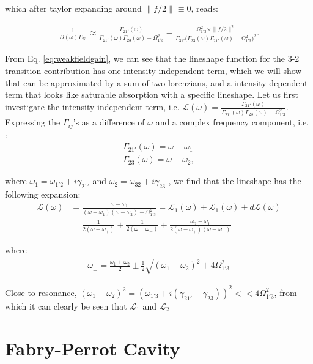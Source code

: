 \documentclass[10pt,english,fleqn]{article}%
\begin{document}
which after taylor expanding around $\|f/2\| \equiv 0$, reads:

\begin{align}
 \frac{1}{D(\omega)\Gamma_{23}} \approx \frac{ \Gamma_{21'}(\omega) }{ \Gamma_{21'}(\omega)\Gamma_{23}(\omega) - \Omega_{1'3}^2} 
 - \frac{\Omega_{1'3}^2 \times \|f/2\|^2}{  \Gamma_{31'} \big (\Gamma_{23}(\omega) \Gamma_{21'}(\omega) - \Omega_{1'3}^2 \big)^2  }. \label{eq:weakfieldgain} 
\end{align}

From Eq. \ref{eq:weakfieldgain}, we can see that the lineshape function for the 3-2 transition contribution has one intensity independent term, which we will show
that can be approximated by a sum of two lorenzians, and a intensity dependent term that looks like saturable absorption with a specific lineshape. Let us first 
investigate the intensity independent term, i.e.  $\mathcal{L}(\omega) = \frac{ \Gamma_{21'}(\omega) }{ \Gamma_{21'}(\omega)\Gamma_{23}(\omega) - \Omega_{1'3}^2} $. Expressing the $\Gamma_{ij}$'s
as  a difference of $\omega$ and a complex frequency component, i.e. :
\begin{align}
 \Gamma_{21'}(\omega) = \omega - \omega_1 \nonumber \\
 \Gamma_{23}(\omega) = \omega - \omega_2 \nonumber, 
\end{align}

where $\omega_1 = \omega_{1'2} +i\gamma_{21'}$ and $\omega_2 = \omega_{32} +i\gamma_{23}$  , we find that the lineshape has the following expansion:
\begin{align}
 \mathcal{L}(\omega) 
 &= \frac{\omega - \omega_1}{(\omega - \omega_1)(\omega - \omega_2) - \Omega_{1'3}^2}
  = \mathcal{L}_1(\omega) + \mathcal{L}_1(\omega) + d\mathcal{L}(\omega) \nonumber \\
 &= \frac{1}{2(\omega - \omega_+)} + \frac{1}{2(\omega - \omega_-)} + \frac{\omega_2 - \omega_1}{2 (\omega - \omega_+) (\omega - \omega_-)}
\end{align}

where 
\begin{align}
\omega_\pm = \frac{ \omega_1 + \omega_2}{2} \pm \frac{1}{2} \sqrt{(\omega_1 - \omega_2)^2 + 4\Omega_{1'3}^2} 
\end{align}

Close to resonance, $(\omega_1 - \omega_2)^2 = (\omega_{1'3} + i (\gamma_{21'} - \gamma_{23}))^2 << 4\Omega_{1'3}^2$, from which it can clearly be seen that
$\mathcal{L}_1$ and $\mathcal{L}_2$

\section{Fabry-Perrot Cavity} 
\end{document}
